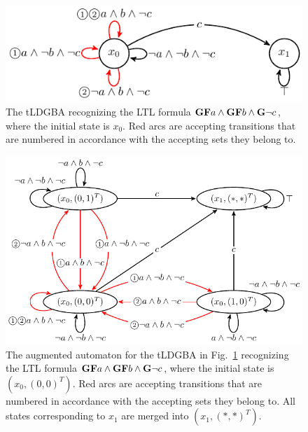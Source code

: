 \begin{figure}[htbp]
   \centering
   \includegraphics[bb=0 0 247 80,scale=0.75]{ldgba_original.pdf}
   \caption{The tLDGBA recognizing the LTL formula $\text{{\bf GF}}a \wedge \text{{\bf GF}}b \wedge \text{{\bf G}}\neg c$, where the initial state is $x_0$. Red arcs are accepting transitions that are numbered in accordance with the accepting sets they belong to.}
   \label{automaton}
\end{figure}
\begin{figure}[htbp]
   \centering
   \includegraphics[bb=0 0 326 207,scale=0.75]{ldgba.pdf}
   \caption{The augmented automaton for the tLDGBA in Fig.~\ref{automaton} recognizing the LTL formula $\text{{\bf GF}}a \wedge \text{{\bf GF}}b \wedge \text{{\bf G}}\neg c$, where the initial state is $(x_0, (0,0)^T )$. Red arcs are accepting transitions that are numbered in accordance with the accepting sets they belong to. All states corresponding to $x_1$ are merged into $(x_1, (*,*)^T )$.}
   \label{automaton_aug}
\end{figure}

